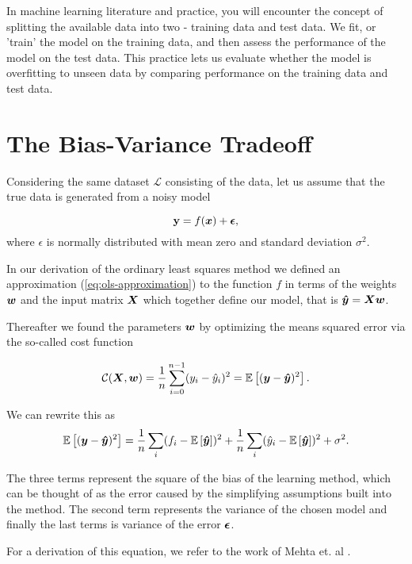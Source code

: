 In machine learning literature and practice, you will encounter the concept of
splitting the available data into two - training data and test data. We fit, or 'train'
the model on the training data, and then assess the performance of the model on the 
test data. This practice lets us evaluate whether the model is overfitting to unseen
data by comparing performance on the training data and test data.

\section{The Bias-Variance Tradeoff}\label{sec:bias-variance}
Considering the same dataset $\mathcal{L}$ consisting of the data,
let us assume that the true data is generated from a noisy model

$$\mathbf{y}=f({\boldsymbol{x}}) + {\boldsymbol{\epsilon}},$$
where $\epsilon$ is normally distributed with mean zero and standard deviation $\sigma^2$.

In our derivation of the ordinary least squares method we defined
an approximation (\ref{eq:ols-approximation}) to the function $f$ in terms of the 
weights ${\boldsymbol{w}}$ and the input matrix ${\boldsymbol{X}}$ which together define our model,
that is ${\boldsymbol{\hat{y}}}={\boldsymbol{X}}{\boldsymbol{w}}$. 

Thereafter we found the parameters ${\boldsymbol{w}}$ by optimizing the means squared error via the so-called cost function

$$\mathcal{C}({\boldsymbol{X}},{\boldsymbol{w}}) =\frac{1}{n}\sum_{i=0}^{n-1}(y_i-\hat{y}_i)^2=\mathbb{E}\left[({\boldsymbol{y}}-{\boldsymbol{\hat{y}}})^2\right].$$

We can rewrite this as 
$$\mathbb{E}\left[({\boldsymbol{y}}-{\boldsymbol{\hat{y}}})^2\right]=\frac{1}{n}\sum_i(f_i-\mathbb{E}\left[{\boldsymbol{\hat{y}}}\right])^2+\frac{1}{n}\sum_i(\hat{y}_i-\mathbb{E}\left[{\boldsymbol{\hat{y}}}\right])^2+\sigma^2.$$

The three terms represent the square of the bias of the learning
method, which can be thought of as the error caused by the simplifying
assumptions built into the method. The second term represents the
variance of the chosen model and finally the last terms is variance of
the error ${\boldsymbol{\epsilon}}$.

For a derivation of this equation, we refer to the work of Mehta et. al \cite{Mehta2019}.

